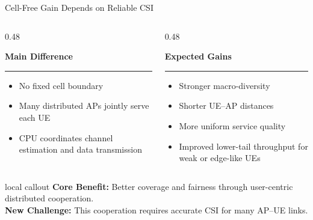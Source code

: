 \documentclass[aspectratio=169, 10pt]{beamer}
\newcommand{\slideheading}[1]{%
    \par\vspace{0.08cm}%
    \settowidth{\dimen0}{\bfseries\large #1}%
    {\bfseries\large #1}%
    \par\vspace{0.015cm}%
    {\color{black}\rule{\dimen0}{0.7pt}}%
    \par\vspace{0.16cm}%
}
\begin{document}
\begin{frame}{Cell-Free Gain Depends on Reliable CSI}
    \begin{columns}[T,onlytextwidth]
        \begin{column}{0.48\textwidth}
            \slideheading{Main Difference}
            \begin{itemize}
                \setlength{\itemsep}{0.75em}
                \item No fixed cell boundary
                \item Many distributed APs jointly serve each UE
                \item CPU coordinates channel estimation and data transmission
            \end{itemize}
        \end{column}
        \begin{column}{0.48\textwidth}
            \slideheading{Expected Gains}
            \begin{itemize}
                \setlength{\itemsep}{0.75em}
                \item Stronger macro-diversity
                \item Shorter UE--AP distances
                \item More uniform service quality
                \item Improved lower-tail throughput for weak or edge-like UEs
            \end{itemize}
        \end{column}
    \end{columns}

    \vspace{0.25cm}
    \begin{beamercolorbox}[wd=\linewidth,sep=0.55ex,leftskip=0.8ex,rightskip=0.8ex,rounded=true]{local callout}
        \small{\color{ku_crimson}\bfseries Core Benefit:} Better coverage and fairness through user-centric distributed cooperation.\\
        \small{\color{ku_crimson}\bfseries New Challenge:} This cooperation requires accurate CSI for many AP--UE links.
    \end{beamercolorbox}
\end{frame}
\end{document}
